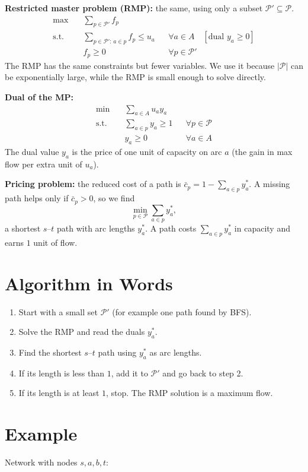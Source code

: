 \documentclass[11pt]{article}
\begin{document}
\textbf{Restricted master problem (RMP):} the same, using only a subset $\mathcal{P}'\subseteq\mathcal{P}$.
\begin{align*}
\max\quad & \sum_{p\in\mathcal{P}'} f_p\\
\text{s.t.}\quad & \sum_{p\in\mathcal{P}':\,a\in p} f_p \le u_a && \forall a\in A \quad [\text{dual } y_a\ge 0]\\
& f_p\ge 0 && \forall p\in\mathcal{P}'
\end{align*}
The RMP has the same constraints but fewer variables. We use it because $|\mathcal{P}|$ can be exponentially large, while the RMP is small enough to solve directly.

\textbf{Dual of the MP:}
\begin{align*}
\min\quad & \sum_{a\in A} u_a y_a\\
\text{s.t.}\quad & \sum_{a\in p} y_a \ge 1 && \forall p\in\mathcal{P}\\
& y_a\ge 0 && \forall a\in A
\end{align*}
The dual value $y_a$ is the price of one unit of capacity on arc $a$ (the gain in max flow per extra unit of $u_a$).

\textbf{Pricing problem:} the reduced cost of a path is $\bar c_p = 1-\sum_{a\in p}y_a^*$. A missing path helps only if $\bar c_p>0$, so we find
\[
\min_{p\in\mathcal{P}} \sum_{a\in p} y_a^*,
\]
a shortest $s$--$t$ path with arc lengths $y^*_a$. A path costs $\sum_{a\in p}y^*_a$ in capacity and earns $1$ unit of flow.

\section{Algorithm in Words}
\begin{enumerate}
  \item Start with a small set $\mathcal{P}'$ (for example one path found by BFS).
  \item Solve the RMP and read the duals $y^*_a$.
  \item Find the shortest $s$--$t$ path using $y^*_a$ as arc lengths.
  \item If its length is less than $1$, add it to $\mathcal{P}'$ and go back to step 2.
  \item If its length is at least $1$, stop. The RMP solution is a maximum flow.
\end{enumerate}

\section{Example}
Network with nodes $s,a,b,t$:
\end{document}
